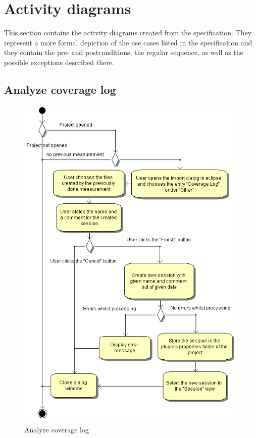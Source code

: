 \section{Activity diagrams} \label{Activities}

This section contains the activity diagrams created from the specification. They represent a more formal depiction of the use cases listed in the specification and they contain the pre- and postconditions, the regular sequence, as well as the possible exceptions described there.

\clearpage
\subsection{Analyze coverage log}
\begin{figure}[htb]
 \centering
 \includegraphics[height=0.7\textheight]{images/Activities/analyze_coverage_log.png}
 \caption{Analyze coverage log}
 \label{ac_fg:analyze}
\end{figure}


